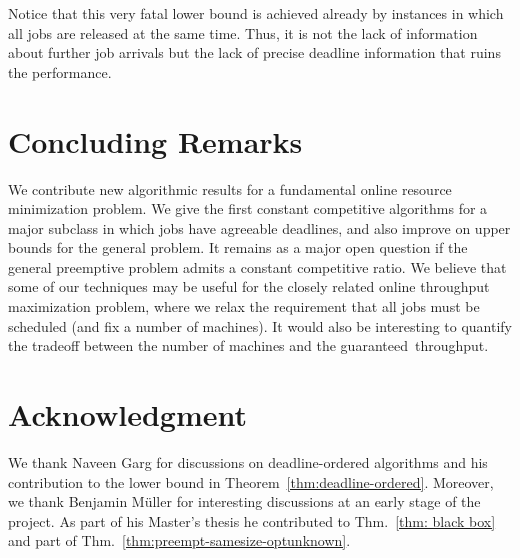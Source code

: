 \documentclass[letterpaper,11pt]{article}
\begin{document}
Notice that this very fatal lower bound is achieved already by instances in which all jobs are released at the same time.  Thus, it is not the lack of information about further job arrivals but the lack of precise deadline information that ruins the performance.

\section{Concluding Remarks}

We contribute new algorithmic results for a fundamental online resource minimization problem. We give the first constant competitive algorithms for a major subclass in which jobs have agreeable deadlines, 
and also improve on upper bounds for the general problem. It remains as a major open question if the general preemptive problem admits a constant competitive ratio. We believe that some of our techniques may be useful for the closely related online throughput maximization problem, where we relax the requirement that all jobs must be scheduled (and fix a number of machines). It would also be interesting to quantify the tradeoff between the number of machines and the guaranteed~throughput.


\section*{Acknowledgment} We thank Naveen Garg for discussions on deadline-ordered algorithms and his contribution to the lower bound in Theorem~\ref{thm:deadline-ordered}. Moreover, we thank Benjamin Müller for interesting discussions at an early stage of the project. As part of his Master's thesis he contributed to Thm.~\ref{thm: black box} and part of Thm.~\ref{thm:preempt-samesize-optunknown}.



\end{document}
